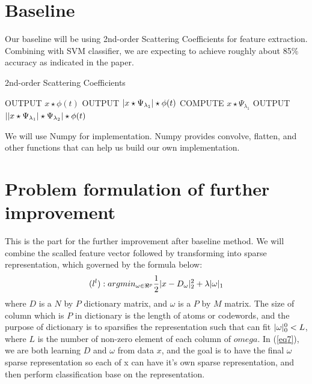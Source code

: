 \documentclass[final]{siamltexmm}
\begin{document}
\section{Baseline}
Our baseline will be using 2nd-order Scattering Coefficients for feature extraction.  Combining with SVM classifier, we are expecting to achieve roughly about 85\% accuracy as indicated in the paper.
\begin{algorithm}[htb]
  \caption{2nd-order Scattering Coefficients}
  \label{algo:SC}
\begin{algorithmic}[1]
      \STATE OUTPUT $x \star \phi(t)$
      \STATE
          \STATE OUTPUT $\arrowvert x \star \Psi_{\lambda_{1}} \arrowvert \star \phi(t)$
          \STATE COMPUTE $x \star \Psi_{\lambda_{1}}$
          \STATE
              OUTPUT $\arrowvert \arrowvert x \star \Psi_{\lambda_{1}} \arrowvert \star \Psi_{\lambda_{2}} \arrowvert \star \phi(t)$
            \ENDFOR
        \ENDFOR
    \ENDFOR
  \ENDFOR
\end{algorithmic}
\end{algorithm}

We will use Numpy for implementation.  Numpy provides convolve, flatten, and other functions that can help us build our own implementation.

\section{Problem formulation of further improvement}
This is the part for the further improvement after baseline method. We will combine the scalled feature vector followed by transforming into sparse representation, which governed by the formula below:
\begin{equation}
(l^{l}): argmin_{\omega \in \Re^{p}} \frac{1}{2} \arrowvert x - D_{\omega} \arrowvert_{2}^{2} + \lambda \arrowvert \omega \arrowvert_{1}\label{eq7}
\end{equation}
where $D$ is a $N$ by $P$ dictionary matrix, and $\omega$ is a $P$ by $M$ matrix. The size of column which is $P$ in dictionary is the length of atoms or codewords, and the purpose of dictionary is to sparsifies the representation such that can fit $\arrowvert \omega \arrowvert_{0}^{0} < L$, where $L$ is the number of non-zero element of each column of $omega$.  In (\ref{eq7}), we are both learning $D$ and $\omega$ from data $x$, and the goal is to have the final $\omega$ sparse representation so each of x can have it’s own sparse representation, and then perform classification base on the representation.
\end{document}
